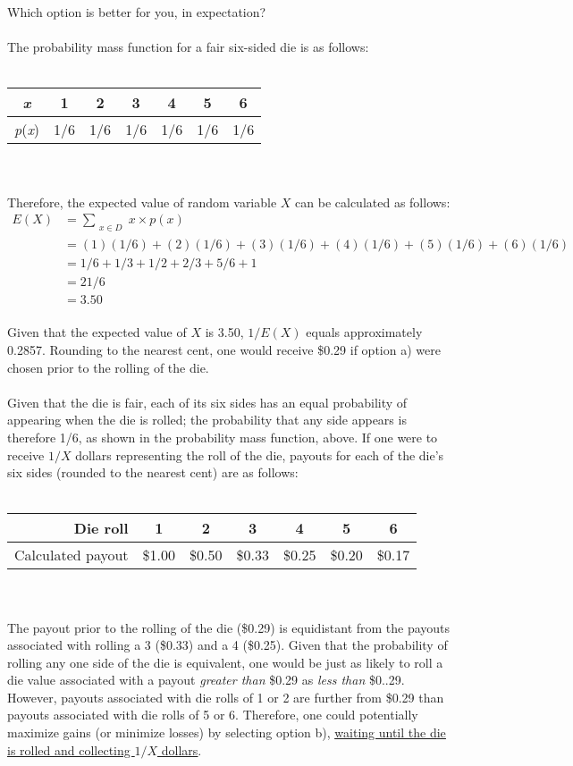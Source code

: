\documentclass[12pt,a4paper]{article}
\numberwithin{equation}{subsection}
\def\doubleunderline#1{\underline{\underline{#1}}}
\begin{document}
\begin{enumerate}
Which option is better for you, in expectation? \\ \\
The probability mass function for a fair six-sided die is as follows: \\ \\
\begin{tabular}{c|cccccc}
\textit{x} & 1 & 2 & 3 & 4 & 5 & 6 \\
\hline
\textit{p}(\textit{x}) & 1/6 & 1/6 & 1/6 & 1/6 & 1/6 & 1/6 \\
\end{tabular} \\ \\
Therefore, the expected value of random variable $X$ can be calculated as follows:
\begin{equation*}
\begin{split}
E(X) & = \sum_{\substack{x \in D}}x \times p(x) \\
& = (1)(1/6) + (2)(1/6) + (3)(1/6) + (4)(1/6) + (5)(1/6) + (6)(1/6)\\
& = 1/6 + 1/3 + 1/2 + 2/3 + 5/6 + 1 \\
& = 21/6 \\
& = 3.50
\end{split}
\end{equation*} \\
Given that the expected value of $X$ is 3.50, $1/E(X)$ equals approximately 0.2857.  Rounding to the nearest cent, one would receive \$0.29 if option a) were chosen prior to the rolling of the die. \\ \\
Given that the die is fair, each of its six sides has an equal probability of appearing when the die is rolled; the probability that any side appears is therefore 1/6, as shown in the probability mass function, above.  If one were to receive $1/X$ dollars representing the roll of the die, payouts for each of the die's six sides (rounded to the nearest cent) are as follows: \\ \\
\begin{tabular}{r|cccccc}
Die roll & 1 & 2 & 3 & 4 & 5 & 6 \\
\hline
Calculated payout & \$1.00 & \$0.50 & \$0.33 & \$0.25 & \$0.20 & \$0.17 \\
\end{tabular} \\ \\
The payout prior to the rolling of the die (\$0.29) is equidistant from the payouts associated with rolling a 3 (\$0.33) and a 4 (\$0.25).  Given that the probability of rolling any one side of the die is equivalent, one would be just as likely to roll a die value associated with a payout \textit{greater than} \$0.29 as \textit{less than} \$0..29.  However, payouts associated with die rolls of 1 or 2 are further from \$0.29 than payouts associated with die rolls of 5 or 6.  Therefore, one could potentially maximize gains (or minimize losses) by selecting option b), \doubleunderline{waiting until the die is rolled and collecting $1/X$ dollars}.


\end{enumerate}
\end{document}
